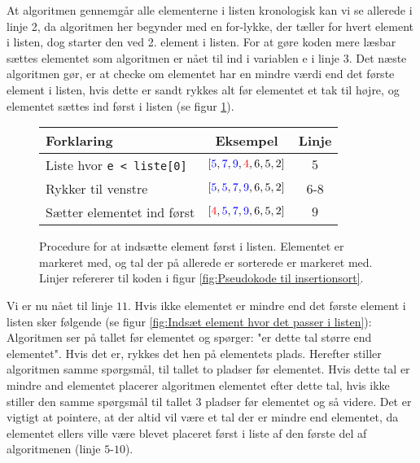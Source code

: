 At algoritmen gennemgår alle elementerne i listen kronologisk kan vi se allerede i linje 2, da algoritmen her begynder med en for-lykke, der tæller for hvert element i listen, dog starter den ved 2. element i listen. For at gøre koden mere læsbar sættes elementet som algoritmen er nået til ind i variablen e i linje 3. Det næste algoritmen gør, er at checke om elementet har en mindre værdi end det første element i listen, hvis dette er sandt rykkes alt før elementet et tak til højre, og elementet sættes ind først i listen (se figur \ref{fig:Indsæt element først i listen}).

\begin{figure}[h]
	\begin{center}
		\padtable
		\begin{tabular}{l|c|c}
			Forklaring & Eksempel & Linje \\
			\hline
			Liste hvor \verb|e < liste[0]| & $[\color{blue}5\color{black},\color{blue}7\color{black},\color{blue}9\color{black},\color{red}4\color{black},6,5,2]$ & $5$ \\
			Rykker til venstre & $[\color{blue}5\color{black},\color{blue}5\color{black},\color{blue}7\color{black},\color{blue}9\color{black},6,5,2]$ & $6$-$8$\\
			Sætter elementet ind først  & $[\color{red}4\color{black},\color{blue}5\color{black},\color{blue}7\color{black},\color{blue}9\color{black},6,5,2]$ & $9$
		\end{tabular}
	\end{center}
	\vspace{-3mm}
	\caption{Procedure for at indsætte element først i listen. Elementet er markeret med, og tal der på allerede er sorterede er markeret med. Linjer refererer til koden i figur \ref{fig:Pseudokode til insertionsort}.}
	\label{fig:Indsæt element først i listen}
\end{figure}


Vi er nu nået til linje $11$. Hvis ikke elementet er mindre end det første element i listen sker følgende (se figur \ref{fig:Indsæt element hvor det passer i listen}): Algoritmen ser på tallet før elementet og spørger: "er dette tal større end elementet". Hvis det er, rykkes det hen på elementets plads. Herefter stiller algoritmen samme spørgsmål, til tallet to pladser før elementet. Hvis dette tal er mindre and elementet placerer algoritmen elementet efter dette tal, hvis ikke stiller den samme spørgsmål til tallet 3 pladser før elementet og så videre. Det er vigtigt at pointere, at der altid vil være et tal der er mindre end elementet, da elementet ellers ville være blevet placeret først i liste af den første del af algoritmenen (linje $5$-$10$).


